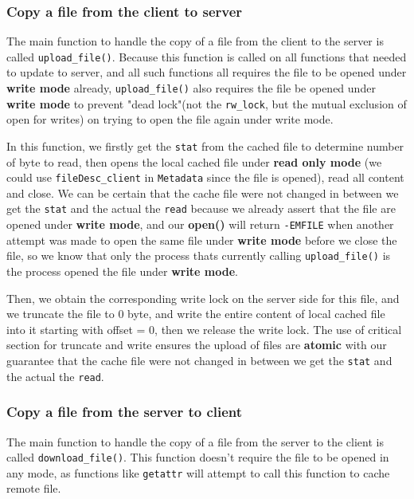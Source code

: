 \documentclass[11pt,a4paper]{article}
\begin{document}
\subsubsection{Copy a file from the client to server}

The main function to handle the copy of a file from the client to the server is called \texttt{upload\_file()}. Because this function is called on all functions that needed to update to server, and all such functions all requires the file to be opened under \textbf{write mode} already, \texttt{upload\_file()} also requires the file be opened under \textbf{write mode} to prevent "dead lock"(not the \texttt{rw\_lock}, but the mutual exclusion of open for writes) on trying to open the file again under write mode.

In this function, we firstly get the \texttt{stat} from the cached file to determine number of byte to read, then opens the local cached file under \textbf{read only mode} (we could use \texttt{fileDesc\_client} in \texttt{Metadata} since the file is opened), read all content and close. We can be certain that the cache file were not changed in between we get the \texttt{stat} and the actual the \texttt{read} because we already assert that the file are opened under \textbf{write mode}, and our \textbf{open()} will return \texttt{-EMFILE} when another attempt was made to open the same file under \textbf{write mode} before we close the file, so we know that only the process thats currently calling \texttt{upload\_file()} is the process opened the file under \textbf{write mode}. 

Then, we obtain the corresponding write lock on the server side for this file, and we truncate the file to 0 byte, and write the entire content of local cached file into it starting with offset = 0, then we release the write lock. The use of critical section for truncate and write ensures the upload of files are \textbf{atomic} with our guarantee that the cache file were not changed in between we get the \texttt{stat} and the actual the \texttt{read}.

\subsubsection{Copy a file from the server to client}

The main function to handle the copy of a file from the server to the client is called \texttt{download\_file()}. This function doesn't require the file to be opened in any mode, as functions like \texttt{getattr} will attempt to call this function to cache remote file.
\end{document}
